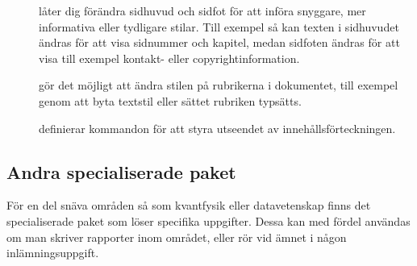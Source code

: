 \documentclass[10pt,../../a4.tex]{subfiles}
\begin{document}
\begin{description}
	\item[]
	låter dig förändra sidhuvud och sidfot för att införa snyggare, mer
	informativa eller tydligare stilar. Till exempel så kan texten i
	sidhuvudet ändras för att visa sidnummer och kapitel, medan sidfoten
	ändras för att visa till exempel kontakt- eller copyrightinformation.
	
	\item[]
	gör det möjligt att ändra stilen på rubrikerna i dokumentet, till
	exempel genom att byta textstil eller sättet rubriken typsätts.

	\item[]
	definierar kommandon för att styra utseendet av
	innehållsförteckningen.
\end{description}

\subsection{Andra specialiserade paket}
För en del snäva områden så som kvantfysik eller datavetenskap finns det
specialiserade paket som löser specifika uppgifter. Dessa kan med fördel
användas om man skriver rapporter inom området, eller rör vid ämnet i
någon inlämningsuppgift.
\end{document}
